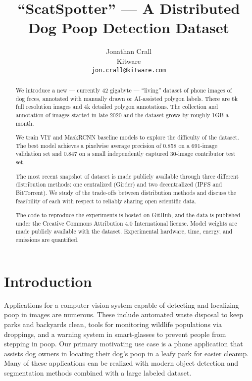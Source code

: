 \documentclass[10pt,twocolumn,letterpaper]{article}
\title{``ScatSpotter'' --- A Distributed Dog Poop Detection Dataset}
\author{Jonathan Crall\\
Kitware\\
{\tt\small jon.crall@kitware.com}
}
\begin{document}
\maketitle


\begin{abstract}

We introduce a new --- currently 42 gigabyte --- ``living'' dataset of phone images of dog feces, annotated with manually drawn or AI-assisted polygon labels. There are 6k full resolution images and 4k detailed polygon annotations. The collection and annotation of images started in late 2020 and the dataset grows by roughly 1GB a month. 

We train VIT and MaskRCNN baseline models to explore the difficulty of the dataset.
The best model achieves a pixelwise average precision of 0.858 on a 691-image
validation set and 0.847 on a small independently captured 30-image contributor
test set.

The most recent snapshot of dataset is made publicly available through three different distribution methods: one centralized (Girder) and two decentralized (IPFS and BitTorrent).  
We study of the trade-offs between distribution methods and discuss the feasibility of each with respect to reliably sharing open scientific data.

The code to reproduce the experiments is hosted on GitHub, and the data is published under the Creative Commons Attribution 4.0 International license.  Model weights are made publicly available with the dataset. Experimental hardware, time, energy, and emissions are quantified.

\end{abstract}

\section{Introduction}
\label{sec:intro}

Applications for a computer vision system capable of detecting and localizing poop in images are numerous.
These include automated waste disposal to keep parks and backyards clean, tools for monitoring wildlife
  populations via droppings, and a warning system in smart-glasses to prevent people from stepping in poop.
Our primary motivating use case is a phone application that assists dog owners in locating their dog's poop
  in a leafy park for easier cleanup.
Many of these applications can be realized with modern object detection and segmentation methods
  \cite{sandler_mobilenetv2_2018, siam_rtseg_2018, yu_mobilenet_yolo_2023} combined with a large labeled
  dataset.
\end{document}
